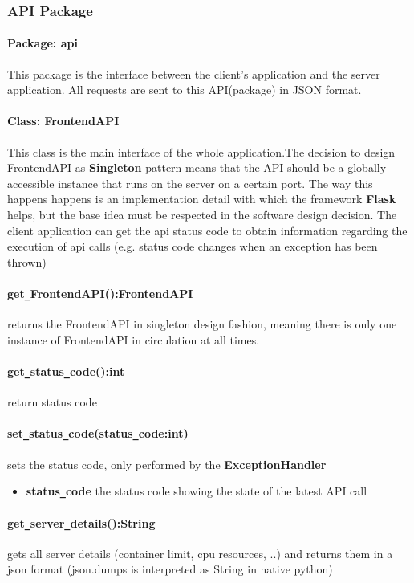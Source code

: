 \subsubsection{API Package}
\paragraph{Package: api} This package is the interface between the client's application and the server application. 
All requests are sent to this API(package) in JSON format.
\paragraph{Class: FrontendAPI}
This class is the main interface of the whole application.The decision to design FrontendAPI as
 \textbf{Singleton} pattern means that the API should be a globally accessible instance that runs on the server
on a certain port. The way this happens happens is an  implementation detail with which the framework
\textbf{Flask} helps, but the base idea must be respected in the software design decision. The client application
can get the api status code to obtain information regarding the execution of api calls (e.g. status code
changes when an exception has been thrown)

\paragraph{get\texttt{\_}FrontendAPI():FrontendAPI} returns the FrontendAPI in singleton design fashion, meaning there is only one instance
of FrontendAPI in circulation at all times.

\paragraph{get\texttt{\_}status\texttt{\_}code():int} return status code  

\paragraph{set\texttt{\_}status\texttt{\_}code(status\texttt{\_}code:int)}
sets the status code, only performed by the \textbf{ExceptionHandler}
\begin{itemize}
        \item \textbf{status\texttt{\_}code}
        the status code showing the state of the latest API call
\end{itemize}

\paragraph{get\texttt{\_}server\texttt{\_}details():String}
gets all server details (container limit, cpu resources, ..) and returns them in a json format
(json.dumps is interpreted as String in native python)

